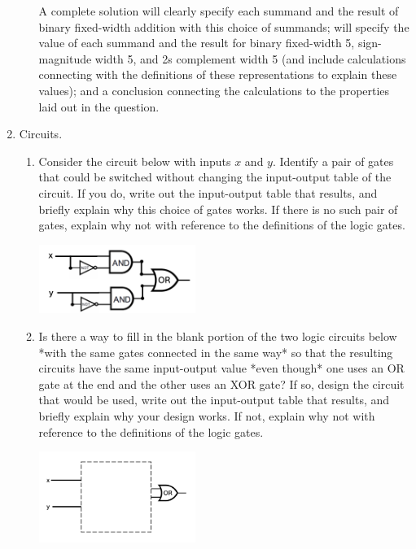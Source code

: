 \begin{enumerate}[labelindent=0pt, leftmargin=0pt]
\begin{enumerate}
            A complete solution will clearly specify each summand and the result of binary fixed-width addition 
            with this choice of summands; will specify  the value of each summand and the result for 
            binary fixed-width 5, 
            sign-magnitude width 5, and 2s complement width 5 (and include calculations connecting with the 
            definitions of these representations to explain these values); and a conclusion connecting
            the calculations to the properties laid out in the question.
        \end{enumerate}    
        \item Circuits. 
        \begin{enumerate}
            \item\gradeComplete Consider the circuit below with inputs $x$ and $y$. 
            Identify a pair of gates that could 
            be switched without changing the input-output table of the circuit.
            If you do, write 
            out the input-output table that results, and briefly explain why 
            this choice of gates works. If there is no such pair of gates, 
            explain why not with reference to the definitions
            of the logic gates.            
        \begin{center}
            \includegraphics[width=2in]{../../files/circuits-hw3.png}
        \end{center}

        \item\gradeCorrect  Is there a way to fill in the blank portion of 
        the two logic circuits below *with the same gates connected in the same way*
        so that the resulting circuits have the same 
        input-output value *even though* one uses an OR gate at the end and the other 
        uses an XOR gate? If so, design the circuit that would be used, write 
        out the input-output table that results, and briefly explain why your 
        design works. If not, explain why not with reference to the definitions
        of the logic gates.
        \begin{multicols}{2}
            \begin{center}
                \includegraphics[width=2in]{../../files/circuit-blank-or-hw3.png}
            \end{center}
     

\end{multicols}
\end{enumerate}
\end{enumerate}
